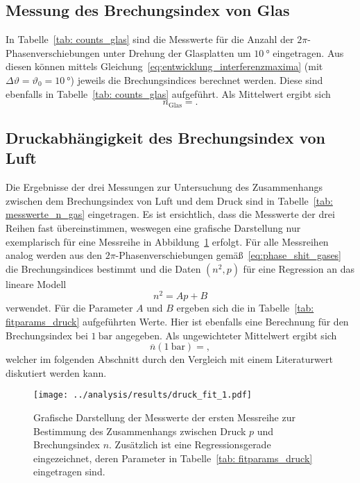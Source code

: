 \subsection{Messung des Brechungsindex von Glas}
In Tabelle~\ref{tab: counts_glas} sind die Messwerte für die Anzahl der $2\pi$-Phasenverschiebungen unter Drehung der Glasplatten um $\SI{10}{\degree}$
eingetragen. Aus diesen können mittels Gleichung~\eqref{eq:entwicklung_interferenzmaxima}
(mit $\Delta\vartheta = \vartheta_0 = \SI{10}{\degree}$) jeweils die Brechungsindices berechnet werden. Diese sind ebenfalls in Tabelle~\ref{tab: counts_glas}
aufgeführt. Als Mittelwert ergibt sich
\begin{equation}
    n_{\text{Glas}} = .
\end{equation}



\subsection{Druckabhängigkeit des Brechungsindex von Luft}
Die Ergebnisse der drei Messungen zur Untersuchung des Zusammenhangs zwischen dem Brechungsindex von Luft und dem Druck sind in
Tabelle~\ref{tab: messwerte_n_gas} eingetragen. Es ist ersichtlich, dass die Messwerte der drei Reihen fast übereinstimmen, weswegen eine grafische
Darstellung nur exemplarisch für eine Messreihe in Abbildung~\ref{fig: fit_druck} erfolgt. Für alle Messreihen analog werden aus
den $2\pi$-Phasenverschiebungen gemäß~\eqref{eq:phase_shit_gases} die Brechungsindices bestimmt und die Daten $(n^2, p)$ für eine Regression an
das lineare Modell
\begin{equation}
    n^2 = A p + B
\end{equation}
verwendet. Für die Parameter $A$ und $B$ ergeben sich die in Tabelle~\ref{tab: fitparams_druck} aufgeführten Werte. Hier ist ebenfalls eine
Berechnung für den Brechungsindex bei $\SI{1}{\bar}$ angegeben. Als ungewichteter Mittelwert ergibt sich
\begin{equation}
    \overline{n}\left(\SI{1}{\bar} \right) = ,
\end{equation}
welcher im folgenden Abschnitt durch den Vergleich mit einem Literaturwert
diskutiert werden kann.

\begin{figure}
    \centering
    \texttt{[image: ../analysis/results/druck\_fit\_1.pdf]}
    \caption{Grafische Darstellung der Messwerte der ersten Messreihe zur Bestimmung des Zusammenhangs zwischen
    Druck $p$ und Brechungsindex $n$. Zusätzlich ist eine Regressionsgerade eingezeichnet, deren Parameter in
    Tabelle~\ref{tab: fitparams_druck} eingetragen sind.}
    \label{fig: fit_druck}
\end{figure}






